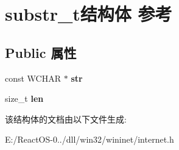 \hypertarget{structsubstr__t}{}\section{substr\+\_\+t结构体 参考}
\label{structsubstr__t}
\subsection*{Public 属性}
\begin{DoxyCompactItemize}
\item 
\mbox{\label{structsubstr__t_ab8d3a6e6811ab1e9f3f09e88ab6fc810}} 
const W\+C\+H\+AR $\ast$ {\bfseries str}
\item 
\mbox{\label{structsubstr__t_a0446bcdbf696840fbd89ab939f55f3ed}} 
size\+\_\+t {\bfseries len}
\end{DoxyCompactItemize}


该结构体的文档由以下文件生成\+:\begin{DoxyCompactItemize}
\item 
E\+:/\+React\+O\+S-\/0../dll/win32/wininet/internet.\+h\end{DoxyCompactItemize}
